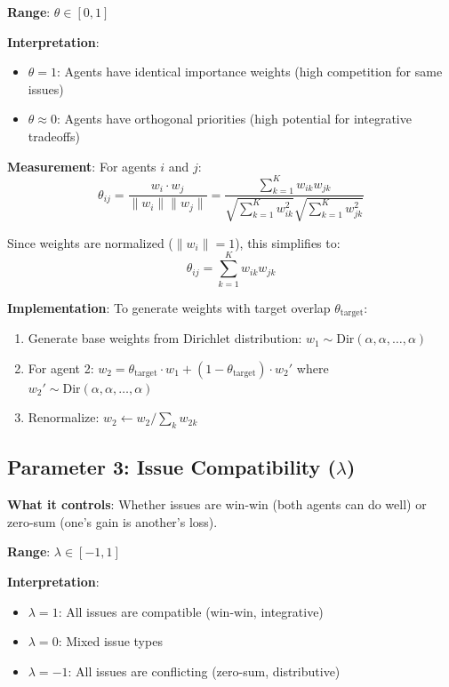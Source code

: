 \documentclass[11pt]{article}
\begin{document}
\textbf{Range}: $\theta \in [0, 1]$

\textbf{Interpretation}:
\begin{itemize}
    \item $\theta = 1$: Agents have identical importance weights (high competition for same issues)
    \item $\theta \approx 0$: Agents have orthogonal priorities (high potential for integrative tradeoffs)
\end{itemize}

\textbf{Measurement}: For agents $i$ and $j$:
\begin{equation}
\theta_{ij} = \frac{w_i \cdot w_j}{\|w_i\| \|w_j\|} = \frac{\sum_{k=1}^{K} w_{ik} w_{jk}}{\sqrt{\sum_{k=1}^{K} w_{ik}^2} \sqrt{\sum_{k=1}^{K} w_{jk}^2}}
\end{equation}

Since weights are normalized ($\|w_i\| = 1$), this simplifies to:
\begin{equation}
\theta_{ij} = \sum_{k=1}^{K} w_{ik} w_{jk}
\end{equation}

\textbf{Implementation}: To generate weights with target overlap $\theta_{\text{target}}$:

\begin{enumerate}
    \item Generate base weights from Dirichlet distribution: $w_1 \sim \text{Dir}(\alpha, \alpha, \ldots, \alpha)$
    \item For agent 2: $w_2 = \theta_{\text{target}} \cdot w_1 + (1-\theta_{\text{target}}) \cdot w_2'$ where $w_2' \sim \text{Dir}(\alpha, \alpha, \ldots, \alpha)$
    \item Renormalize: $w_2 \leftarrow w_2 / \sum_k w_{2k}$
\end{enumerate}

\subsection{Parameter 3: Issue Compatibility ($\lambda$)}

\textbf{What it controls}: Whether issues are win-win (both agents can do well) or zero-sum (one's gain is another's loss).

\textbf{Range}: $\lambda \in [-1, 1]$

\textbf{Interpretation}:
\begin{itemize}
    \item $\lambda = 1$: All issues are compatible (win-win, integrative)
    \item $\lambda = 0$: Mixed issue types
    \item $\lambda = -1$: All issues are conflicting (zero-sum, distributive)
\end{itemize}
\end{document}
